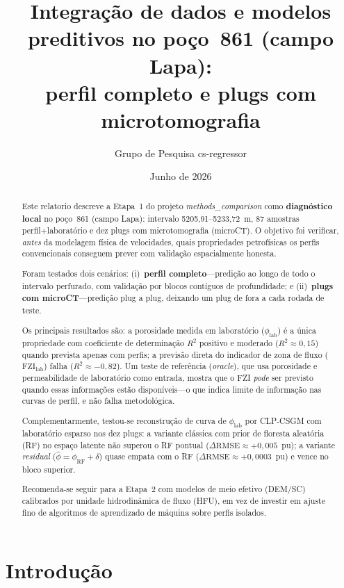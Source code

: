 \documentclass[11pt,a4paper]{article}
\title{%
  Integração de dados e modelos preditivos no poço~861 (campo Lapa):\\
  perfil completo e plugs com microtomografia
}
\author{Grupo de Pesquisa cs-regressor}
\date{Junho de 2026}
\newcommand{\philab}{\ensuremath{\phi_{\mathrm{lab}}}}
\newcommand{\fzilab}{\ensuremath{\mathrm{FZI}_{\mathrm{lab}}}}
\begin{document}
\maketitle

\begin{abstract}
Este relatorio descreve a Etapa~1 do projeto \emph{methods\_comparison} como
\textbf{diagnóstico local} no poço~861 (campo Lapa): intervalo 5205,91--5233,72~m,
87 amostras perfil+laboratório e dez plugs com microtomografia (microCT).
O objetivo foi verificar, \emph{antes} da modelagem física de velocidades,
quais propriedades petrofísicas os perfis convencionais conseguem prever com
validação espacialmente honesta.

Foram testados dois cenários: (i)~\textbf{perfil completo}---predição
ao longo de todo o intervalo perfurado, com validação por blocos
contíguos de profundidade; e (ii)~\textbf{plugs com microCT}---predição
plug a plug, deixando um plug de fora a cada rodada de teste.

Os principais resultados são: a porosidade medida em laboratório
(\philab) é a única propriedade com coeficiente de
determinação $R^2$ positivo e moderado ($R^2 \approx 0{,}15$) quando
prevista apenas com perfis; a previsão direta do indicador de zona de
fluxo (\fzilab) falha ($R^2 \approx -0{,}82$).
Um teste de referência (\emph{oracle}), que usa porosidade e
permeabilidade de laboratório como entrada, mostra que o FZI \emph{pode}
ser previsto quando essas informações estão disponíveis---o que
indica limite de informação nas curvas de perfil, e não falha
metodológica.

Complementarmente, testou-se reconstrução de curva de \philab{} por
CLP-CSGM com laboratório esparso nos dez plugs: a variante clássica com
prior de floresta aleatória (RF) no espaço latente não superou o RF
pontual ($\Delta\mathrm{RMSE} \approx +0{,}005$~pu); a variante
\emph{residual} ($\widehat{\phi}=\phi_{\mathrm{RF}}+\delta$) quase empata
com o RF ($\Delta\mathrm{RMSE} \approx +0{,}0003$~pu) e vence no bloco
superior.

Recomenda-se seguir para a Etapa~2 com modelos de meio efetivo (DEM/SC)
calibrados por unidade hidrodinâmica de fluxo (HFU), em vez de investir
em ajuste fino de algoritmos de aprendizado de máquina sobre perfis
isolados.
\end{abstract}

\section{Introdução}
\label{sec:intro}
\end{document}
